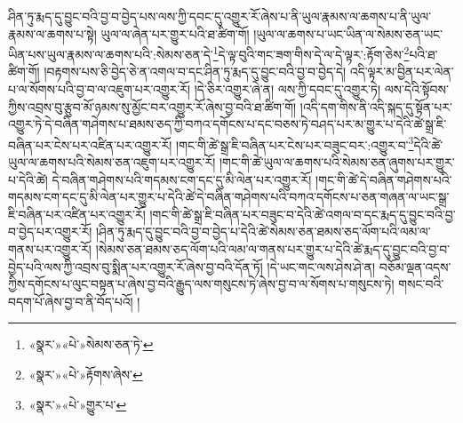 ཤིན་ཏུ་རྨད་དུ་བྱུང་བའི་བྱ་བ་བྱེད་པས་ལས་ཀྱི་དབང་དུ་འགྱུར་རོ་ཞེས་པ་ནི་ཡུལ་རྣམས་ལ་ཆགས་པ་ནི་ཡུལ་རྣམས་ལ་ཆགས་པ་སྟེ། ཡུལ་ལ་ཞེན་པར་གྱུར་པའི་ཐ་ཚིག་གོ། །ཡུལ་ལ་ཆགས་པ་ཡང་ཡིན་ལ་སེམས་ཅན་ཡང་ཡིན་པས་ཡུལ་རྣམས་ལ་ཆགས་པའི་:སེམས་ཅན་དེ་\footnote{«སྣར་»«པེ་»སེམས་ཅན་ཏེ་}དེ་ལྟ་བུའི་གང་ཟག་གིས་དེ་ལ་དེ་ལྟར་:རྟོག་ཅེས་\footnote{«སྣར་»«པེ་»རྟོགས་ཞེས་}པའི་ཐ་ཚིག་གོ། །བརྟགས་པས་ཅི་བྱེད་ཅེ་ན་འགལ་བ་དང་ཤིན་ཏུ་རྨད་དུ་བྱུང་བའི་བྱ་བ་བྱེད་དེ། འདི་ལྟར་མ་བྱིན་པར་ལེན་པ་ལ་སོགས་པའི་བྱ་བ་ལ་འཇུག་པར་འགྱུར་རོ། །དེ་ཅིར་འགྱུར་ཞེ་ན། ལས་ཀྱི་དབང་དུ་འགྱུར་ཏེ། ལས་དེའི་སྟོབས་ཀྱིས་འབྲས་བུ་རྩུབ་མོ་ཉམས་སུ་མྱོང་བར་འགྱུར་རོ་ཞེས་བྱ་བའི་ཐ་ཚིག་གོ། །འདི་དག་གིས་ནི་འདི་སྐད་དུ་སྟོན་པར་འགྱུར་ཏེ་དེ་བཞིན་གཤེགས་པ་ཐམས་ཅད་ཀྱི་བཀའ་དགོངས་པ་དང་བཅས་ཏེ་བཤད་པར་མ་གྱུར་པ་དེའི་ཚེ་སྒྲ་ཇི་བཞིན་པར་ངེས་པར་འཛིན་པར་འགྱུར་རོ། །གང་གི་ཚེ་སྒྲ་ཇི་བཞིན་པར་ངེས་པར་བཟུང་བར་:འགྱུར་བ་\footnote{«སྣར་»«པེ་»གྱུར་པ་}དེའི་ཚེ་ཡུལ་ལ་ཆགས་པའི་སེམས་ཅན་འཇུག་པར་འགྱུར་རོ། །གང་གི་ཚེ་ཡུལ་ལ་ཆགས་པའི་སེམས་ཅན་ཞུགས་པར་གྱུར་པ་དེའི་ཚེ། དེ་བཞིན་གཤེགས་པའི་གདམས་ངག་དང་དུ་མི་ལེན་པར་འགྱུར་རོ། །གང་གི་ཚེ་དེ་བཞིན་གཤེགས་པའི་གདམས་ངག་དང་དུ་མི་ལེན་པར་གྱུར་པ་དེའི་ཚེ་དེ་བཞིན་གཤེགས་པའི་བཀའ་དགོངས་པ་ཅན་གཞན་ལ་ཡང་སྒྲ་ཇི་བཞིན་པར་འཛིན་པར་འགྱུར་རོ། །གང་གི་ཚེ་སྒྲ་ཇི་བཞིན་པར་བཟུང་བ་དེའི་ཚེ་འགལ་བ་དང་རྨད་དུ་བྱུང་བའི་བྱ་བ་བྱེད་པར་འགྱུར་རོ། །ཤིན་ཏུ་རྨད་དུ་བྱུང་བའི་བྱ་བ་བྱེད་པ་དེའི་ཚེ་སེམས་ཅན་ཐམས་ཅད་ལོག་པའི་ལམ་ལ་གནས་པར་འགྱུར་རོ། །སེམས་ཅན་ཐམས་ཅད་ལོག་པའི་ལམ་ལ་གནས་པར་གྱུར་པ་དེའི་ཚེ་རྨད་དུ་བྱུང་བའི་བྱ་བ་བྱེད་པའི་ལས་ཀྱི་འབྲས་བུ་སྨིན་པར་འགྱུར་རོ་ཞེས་བྱ་བའི་དོན་ཏོ། །དེ་ཡང་གང་ལས་ཤེས་ཤེ་ན། བཅོམ་ལྡན་འདས་ཀྱིས་དགོངས་པ་ལུང་བསྟན་པ་ཞེས་བྱ་བའི་རྒྱུད་ལས་གསུངས་ཏེ་ཞེས་བྱ་བ་ལ་སོགས་པ་གསུངས་ཏེ། གསང་བའི་བདག་པོ་ཞེས་བྱ་བ་ནི་བོད་པའོ། །
